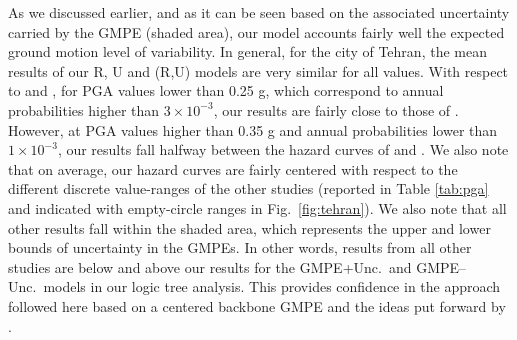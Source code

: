 As we discussed earlier, and as it can be seen based on the associated uncertainty carried by the GMPE (shaded area), our model accounts fairly well the expected ground motion level of variability. In general, for the city of Tehran, the mean results of our R, U and (R,U) models are very similar for all values. With respect to \citet{Ghodrati2003} and \citet{Boostan2015}, for PGA values lower than 0.25 g, which correspond to annual probabilities higher than $3 \times 10^{-3}$, our results are fairly close to those of \citet{Boostan2015}. However, at PGA values higher than 0.35 g and annual probabilities lower than $1 \times 10^{-3}$, our results fall halfway between the hazard curves of \citet{Ghodrati2003} and \citet{Boostan2015}. We also note that on average, our hazard curves are fairly centered with respect to the different discrete value-ranges of the other studies (reported in Table \ref{tab:pga} and indicated with empty-circle ranges in Fig.~\ref{fig:tehran}). We also note that all other results fall within the shaded area, which represents the upper and lower bounds of uncertainty in the GMPEs. In other words, results from all other studies are below and above our results for the GMPE+Unc.~and GMPE--Unc.~models in our logic tree analysis. This provides confidence in the approach followed here based on a centered backbone GMPE and the ideas put forward by \citet{Atkinson2014}.
